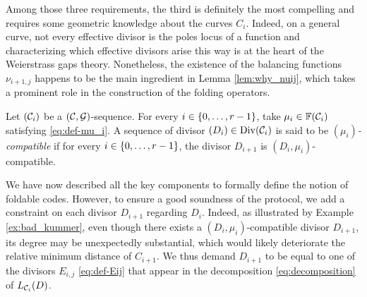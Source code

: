 \documentclass[10pt]{article}
\begin{document}
Among those three requirements, the third is definitely the most compelling and requires some geometric knowledge about the curves $C_i$. Indeed, on a general curve, not every effective divisor is the poles locus of a function and characterizing which effective divisors arise this way is at the heart of the Weierstrass gaps theory. Nonetheless, the existence of the balancing functions $\nu_{i+1,j}$ happens to be the main ingredient in Lemma \ref{lem:why_nuij}, which takes a prominent role in the construction of the folding operators.

\begin{definition}[$(\mu_i)$-compatibility]\label{def-mu_i_compatible}
	Let $(\mathcal{C}_i)$ be a $(\mathcal{C},\mathcal{G})$-sequence. For every $i \in \left\{0,\dots,r-1\right\}$, take $\mu_i \in \mathbb{F}(\mathcal{C}_i)$ satisfying \eqref{eq:def-mu_i}. A sequence of divisor $(D_i) \in \operatorname{Div}(\mathcal{C}_i)$ is said to be \emph{$(\mu_i)$-compatible} if for every $i \in \left\{0,\dots,r-1\right\}$, the divisor $D_{i+1}$ is $(D_i,\mu_i)$-compatible.
\end{definition}

We have now described all the key components to formally define the notion of foldable codes. However, to ensure a good soundness of the protocol, we add a constraint on each divisor $D_{i+1}$ regarding $D_i$. Indeed, as illustrated by Example \ref{ex:bad_kummer}, even though there exists a $(D_i,\mu_i)$-compatible divisor $D_{i+1}$, its degree may be unexpectedly substantial, which would likely deteriorate the relative minimum distance of $C_{i+1}$. We thus demand $D_{i+1}$ to be equal to one of the divisors $E_{i,j}$ \eqref{eq:def-Eij} that appear in the decomposition \eqref{eq:decomposition} of $L_{\mathcal{C}_i}(D)$.

\end{document}
